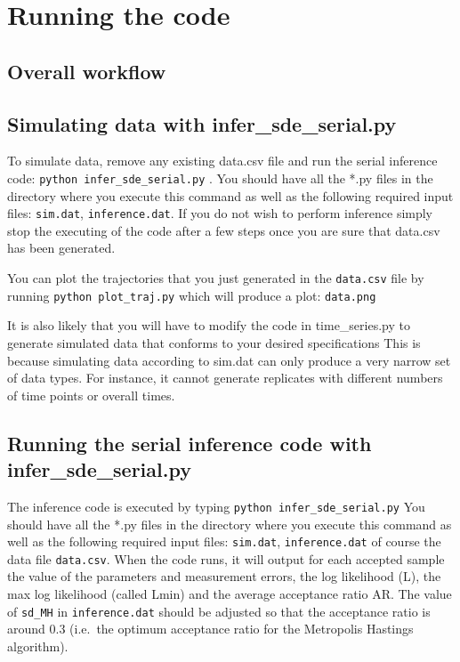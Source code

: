 \documentclass[]{article}   %
\begin{document}
\section{Running the code}

\subsection{Overall workflow} 

\subsection{Simulating data with infer\_sde\_serial.py}

To simulate data, remove any existing data.csv file and run the serial inference code: {\tt python infer\_sde\_serial.py} . You should have all the *.py files in the directory where you execute this command as well as the following required input files: {\tt sim.dat}, {\tt inference.dat}. 
 If you do not wish to perform inference simply stop the executing of the code after a few steps once you are sure that data.csv has been generated. 

You can plot the trajectories that you just generated in the {\tt data.csv} file by running {\tt python plot\_traj.py} which will produce a plot: {\tt data.png}

It is also likely that you will have to modify the code in time\_series.py to generate simulated data that conforms to your desired specifications This is because simulating data according to sim.dat can only produce a very narrow set of data types. For instance, it cannot generate replicates with different numbers of time points or overall times.

\subsection{Running the serial inference code with infer\_sde\_serial.py}

The inference code is executed by typing {\tt python infer\_sde\_serial.py}
You should have all the *.py files in the directory where you execute this command as well as the following required input files: {\tt sim.dat}, {\tt inference.dat} of course the data file {\tt data.csv}. When the code runs, it will output for each accepted sample the value of the parameters and measurement errors, the log likelihood (L), the max log likelihood (called Lmin) and the average acceptance ratio AR. The value of {\tt sd\_MH} in {\tt inference.dat} should be adjusted so that the acceptance ratio is around 0.3 (i.e.~the optimum acceptance ratio for the Metropolis Hastings algorithm).
\end{document}
